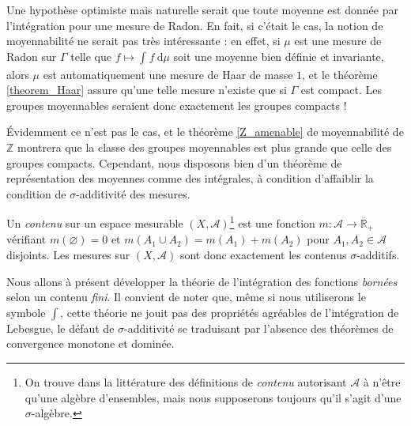 \documentclass[a4paper,12pt]{article}
\newcommand{\R}{\mathbb{R}}
\newcommand{\Z}{\mathbb{Z}}
\newcommand{\integral}[4]{\int_{#1}^{#2} #3~\mathrm{d}#4}
\newcommand{\closure}[1]{\overline{#1}}
\newcommand{\TODO}[1]{{\color{red}TODO :} #1}
\begin{document}
Une hypothèse optimiste mais naturelle serait que toute moyenne est donnée par l'intégration pour une mesure 
de Radon. En fait, si c'était le cas, la notion de moyennabilité ne serait pas très intéressante :
en effet, si $\mu$ est une mesure de Radon sur $\Gamma$ telle que $f\mapsto\integral{}{}{f}{\mu}$ soit une moyenne bien définie et invariante,
alors $\mu$ est automatiquement une mesure de Haar de masse $1$, et le théorème \ref{theorem_Haar} assure qu'une telle mesure n'existe que si
$\Gamma$ est compact. Les groupes moyennables seraient donc exactement les groupes compacts !

Évidemment ce n'est pas le cas, et le théorème \ref{Z_amenable} de moyennabilité de $\Z$ montrera que la classe des groupes moyennables est plus grande que 
celle des groupes compacts. Cependant, nous disposons bien d'un théorème de représentation des moyennes comme des
\og{}intégrales\fg{}, à condition d'affaiblir la condition de $\sigma$-additivité des mesures.

Un \emph{contenu} sur un espace mesurable $(X, \mathcal{A})$\footnote{On trouve dans la littérature des définitions de \emph{contenu} autorisant $\mathcal{A}$ à n'être qu'une algèbre d'ensembles,
mais nous supposerons toujours qu'il s'agit d'une $\sigma$-algèbre.} est une fonction $m:\mathcal{A}\to\closure{\R}_+$ vérifiant $m(\varnothing) = 0$
et $m(A_1\cup A_2) = m(A_1) + m(A_2)$ pour $A_1, A_2\in\mathcal{A}$ disjoints. Les mesures sur $(X, \mathcal{A})$
sont donc exactement les contenus $\sigma$-additifs. 

Nous allons à présent développer la théorie de l'intégration des fonctions \emph{bornées} selon un contenu \emph{fini}. Il convient de noter que,
même si nous utiliserons le symbole $\int$, cette théorie ne jouit pas des propriétés agréables de l'intégration de Lebesgue,
le défaut de $\sigma$-additivité se traduisant par l'absence des théorèmes de convergence monotone et dominée.
\end{document}
